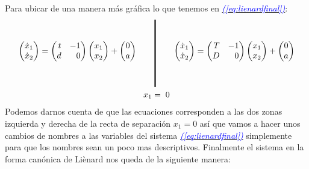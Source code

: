\documentclass[12pt,a4paper]{report} %
\newcommand{\eref}[1]{\hyperref[#1]{\textcolor{blue}{\textit{(\ref*{#1})}}}}
\begin{document}
	Para ubicar de una manera más gráfica lo que tenemos en \eref{eq:lienardfinal}:
	\begin{equation}
		\label{eq:lienardfinalgr}
		\begin{gathered}
			\begin{pmatrix*}[r]
				\dot{x}_1\\ \dot{x}_2
			\end{pmatrix*}= \begin{pmatrix*}[r]
				t & -1 \\ d & 0
			\end{pmatrix*} \begin{pmatrix*}[r]
				x_1 \\ x_2
			\end{pmatrix*}+\begin{pmatrix*}[c]
				0 \\ a
			\end{pmatrix*} \qquad 
			\rule[-40pt]{1.5pt}{80pt} \qquad 
			\begin{pmatrix*}[r]
				\dot{x}_1\\ \dot{x}_2
			\end{pmatrix*}= \begin{pmatrix*}[r]
				T & -1 \\ D & 0
			\end{pmatrix*} \begin{pmatrix*}[r]
				x_1 \\ x_2
			\end{pmatrix*}+\begin{pmatrix*}[c]
				0 \\ a
			\end{pmatrix*} \\ x_1=\;0
		\end{gathered}
	\end{equation}\smallskip
	\newpage
	Podemos darnos cuenta de que las ecuaciones corresponden a las dos zonas izquierda y derecha de la recta de separación $x_1=0$ así que vamos a hacer unos cambios de nombres a las variables del sistema \eref{eq:lienardfinal} simplemente para que los nombres sean un poco mas descriptivos. Finalmente el sistema en la forma canónica de Liènard nos queda de la siguiente manera:
	
\end{document}
